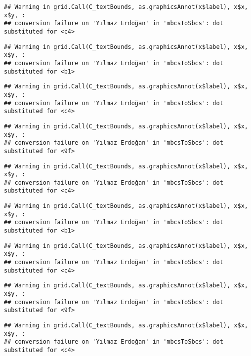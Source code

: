 \documentclass[
]{article}
\begin{document}
\begin{verbatim}
## Warning in grid.Call(C_textBounds, as.graphicsAnnot(x$label), x$x, x$y, :
## conversion failure on 'Yılmaz Erdoğan' in 'mbcsToSbcs': dot substituted for <c4>
\end{verbatim}

\begin{verbatim}
## Warning in grid.Call(C_textBounds, as.graphicsAnnot(x$label), x$x, x$y, :
## conversion failure on 'Yılmaz Erdoğan' in 'mbcsToSbcs': dot substituted for <b1>
\end{verbatim}

\begin{verbatim}
## Warning in grid.Call(C_textBounds, as.graphicsAnnot(x$label), x$x, x$y, :
## conversion failure on 'Yılmaz Erdoğan' in 'mbcsToSbcs': dot substituted for <c4>
\end{verbatim}

\begin{verbatim}
## Warning in grid.Call(C_textBounds, as.graphicsAnnot(x$label), x$x, x$y, :
## conversion failure on 'Yılmaz Erdoğan' in 'mbcsToSbcs': dot substituted for <9f>
\end{verbatim}

\begin{verbatim}
## Warning in grid.Call(C_textBounds, as.graphicsAnnot(x$label), x$x, x$y, :
## conversion failure on 'Yılmaz Erdoğan' in 'mbcsToSbcs': dot substituted for <c4>
\end{verbatim}

\begin{verbatim}
## Warning in grid.Call(C_textBounds, as.graphicsAnnot(x$label), x$x, x$y, :
## conversion failure on 'Yılmaz Erdoğan' in 'mbcsToSbcs': dot substituted for <b1>
\end{verbatim}

\begin{verbatim}
## Warning in grid.Call(C_textBounds, as.graphicsAnnot(x$label), x$x, x$y, :
## conversion failure on 'Yılmaz Erdoğan' in 'mbcsToSbcs': dot substituted for <c4>
\end{verbatim}

\begin{verbatim}
## Warning in grid.Call(C_textBounds, as.graphicsAnnot(x$label), x$x, x$y, :
## conversion failure on 'Yılmaz Erdoğan' in 'mbcsToSbcs': dot substituted for <9f>
\end{verbatim}

\begin{verbatim}
## Warning in grid.Call(C_textBounds, as.graphicsAnnot(x$label), x$x, x$y, :
## conversion failure on 'Yılmaz Erdoğan' in 'mbcsToSbcs': dot substituted for <c4>
\end{verbatim}
\end{document}
